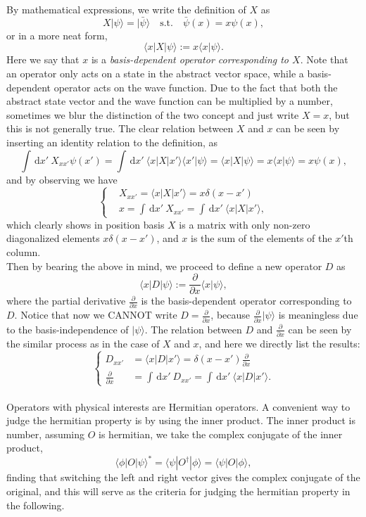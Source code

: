 \documentclass{article}
\newcommand{\be}{\begin{equation}}
\newcommand{\ee}{\end{equation}}
\newcommand{\dif}{\,\mathrm{d}}
\newcommand{\p}{\partial}
\renewcommand{\1}{\left}
\renewcommand{\2}{\right}
\newcommand{\la}{\langle}
\newcommand{\ra}{\rangle}
\newcommand{\del}{\delta}
\begin{document}
By mathematical expressions, we write the definition of $X$ as
\be
X|\psi\ra=|\bar\psi\ra \quad\text{s.t.}\quad \bar\psi(x)=x\psi(x),
\ee
or in a more neat form,
\be
\la x|X|\psi\ra:=x\la x|\psi\ra.
\ee
Here we say that $x$ is a \textit{basis-dependent operator corresponding to $X$}. Note that an operator only acts on a state in the abstract vector space, while a basis-dependent operator acts on the wave function. Due to the fact that both the abstract state vector and the wave function can be multiplied by a number, sometimes we blur the distinction of the two concept and just write $X=x$, but this is not generally true. The clear relation between $X$ and $x$ can be seen by inserting an identity relation to the definition, as
\be
\int \dif x'\ X_{xx'} \psi(x')=\int \dif x' \ \la x|X|x'\ra\la x'|\psi\ra=\la x|X|\psi\ra=x\la x|\psi\ra=x \psi(x),
\ee
and by observing we have 
\be\1\{\begin{split}
&X_{xx'}= \la x|X|x'\ra=x\del(x-x')\\
&x=\int \dif x'\ X_{xx'}=\int \dif x'\ \la x|X|x'\ra,
\end{split}\2.\ee
which clearly shows in position basis $X$ is a matrix with only non-zero diagonalized elements $x\del(x-x')$, and $x$ is the sum of the elements of the $x'$th column.\\

Then by bearing the above in mind, we proceed to define a new operator $D$ as
\be
\la x|D|\psi\ra:=\frac\p{\p x}\la x|\psi\ra,
\ee
where the partial derivative $\frac\p{\p x}$ is the basis-dependent operator corresponding to $D$. Notice that now we CANNOT write $D=\frac\p{\p x}$, because $\frac\p{\p x}|\psi\ra$ is meaningless due to the basis-independence of $|\psi\ra$. The relation between $D$ and $\frac\p{\p x}$ can be seen by the similar process as in the case of $X$ and $x$, and here we directly list the results:
\be\1\{\begin{split}
D_{xx'}&= \la x|D|x'\ra=\del(x-x')\frac\p{\p x}\\
\frac\p{\p x}&=\int \dif x'\ D_{xx'}=\int \dif x'\ \la x|D|x'\ra.
\end{split}\2.\ee\\

Operators with physical interests are Hermitian operators. A convenient way to judge the hermitian property is by using the inner product. The inner product is number, assuming $O$ is hermitian, we take the complex conjugate of the inner product,
\be
\la\phi|O|\psi\ra^*=\la\psi|O^\dagger|\phi\ra=\la\psi|O|\phi\ra,
\ee
finding that switching the left and right vector gives the complex conjugate of the original, and this will serve as the criteria for judging the hermitian property in the following.
\end{document}
